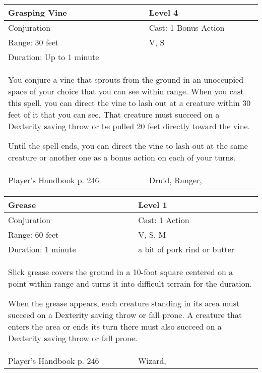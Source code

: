 \documentclass[11pt]{report}
\begin{document}
\begin{table}[H]
	\begin{tabular}{||p{6cm}|p{6cm}||}
		\hline\hline
		\bf{Grasping Vine} & Level 4\\ \hline
		Conjuration & Cast: 1 Bonus Action\\ \hline
		Range: 30 feet & V, S\\ \hline
		Duration: Up to 1 minute & \\ \hline
		\multicolumn{2}{||p{12cm}||}{You conjure a vine that sprouts from the ground in an unoccupied space of your choice that you can see within range. When you cast this spell, you can direct the vine to lash out at a creature within 30 feet of it that you can see. That creature must succeed on a Dexterity saving throw or be pulled 20 feet directly toward the vine.

Until the spell ends, you can direct the vine to lash out at the same creature or another one as a bonus action on each of your turns.}\\ \hline
Player's Handbook p. 246 & Druid, Ranger, \\ \hline\hline
	\end{tabular}
\end{table}

\begin{table}[H]
	\begin{tabular}{||p{6cm}|p{6cm}||}
		\hline\hline
		\bf{Grease} & Level 1\\ \hline
		Conjuration & Cast: 1 Action\\ \hline
		Range: 60 feet & V, S, M\\ \hline
		Duration: 1 minute & a bit of pork rind or butter\\ \hline
		\multicolumn{2}{||p{12cm}||}{Slick grease covers the ground in a 10-foot square centered on a point within range and turns it into difficult terrain for the duration.

When the grease appears, each creature standing in its area must succeed on a Dexterity saving throw or fall prone. A creature that enters the area or ends its turn there must also succeed on a Dexterity saving throw or fall prone.}\\ \hline
Player's Handbook p. 246 & Wizard, \\ \hline\hline
	\end{tabular}
\end{table}
\end{document}
